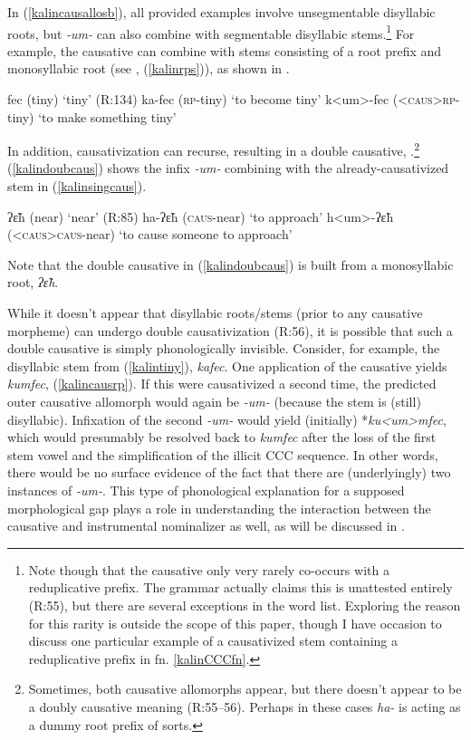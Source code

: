 \documentclass[output=paper]{langscibook}
\begin{document}
In (\ref{kalincausallosb}), all provided examples involve unsegmentable disyllabic roots, but \textit{-um-} can also combine with segmentable disyllabic stems.\footnote{Note though that the causative only very rarely co-occurs with a reduplicative prefix. The grammar actually claims this is unattested entirely (R:55), but there are several exceptions in the word list. Exploring the reason for this rarity is outside the scope of this paper, though I have occasion to discuss one particular example of a causativized stem containing a reduplicative prefix in fn. \ref{kalinCCCfn}.\label{kalinredfn}} For example, the causative can combine with stems consisting of a root prefix and monosyllabic root (see , (\ref{kalinrps})), as shown in \Next.

\ea \ea fec (tiny) \hfill `tiny' (R:134)
\ex ka-fec (\textsc{rp}-tiny) \hfill `to become tiny'\label{kalintiny}
\ex\label{kalincausrp} k<um>-fec (\textsc{<caus>rp}-tiny) \hfill `to make something tiny'
\z
\z

\noindent In addition, causativization can recurse, resulting in a double causative, \Next.\footnote{Sometimes, both causative allomorphs appear, but there doesn't appear to be a doubly causative meaning (R:55--56). Perhaps in these cases \textit{ha-} is acting as a dummy root prefix of sorts.} (\ref{kalindoubcaus}) 
shows the infix \textit{-um-} combining with the already-causativized stem in (\ref{kalinsingcaus}).\largerpage%

\ea \ea ʔ\~εh (near) \hfill `near'  (R:85)
\ex ha-ʔ\~εh (\textsc{caus-}near) \hfill `to approach'\label{kalinsingcaus}
\ex\label{kalindoubcaus} h<um>-ʔ\~εh (\textsc{<caus>caus-}near)  \hfill `to cause someone to approach'
\z
\z

\noindent Note that the double causative in (\ref{kalindoubcaus}) is built from a monosyllabic root, \textit{ʔ\~εh}. 

While it doesn't appear that disyllabic roots/stems (prior to any causative morpheme) can undergo double causativization (R:56), it is possible that such a double causative is simply phonologically invisible. Consider, for example, the disyllabic stem from (\ref{kalintiny}), \textit{kafec}. One application of the causative yields \textit{kumfec}, (\ref{kalincausrp}). If this were causativized a second time, the predicted outer causative allomorph would again be \textit{-um-} (because the stem is (still) disyllabic). Infixation of the second \textit{-um-} would yield (initially) *\textit{ku<um>mfec}, which would presumably be resolved back to \textit{kumfec} after the loss of the first stem vowel and the simplification of the illicit CCC sequence. In other words, there would be no surface evidence of the fact that there are (underlyingly) two instances of \textit{-um-}. This type of phonological explanation for a supposed morphological gap plays a role in understanding the interaction between the causative and instrumental nominalizer as well, as will be discussed in .\largerpage
\end{document}
